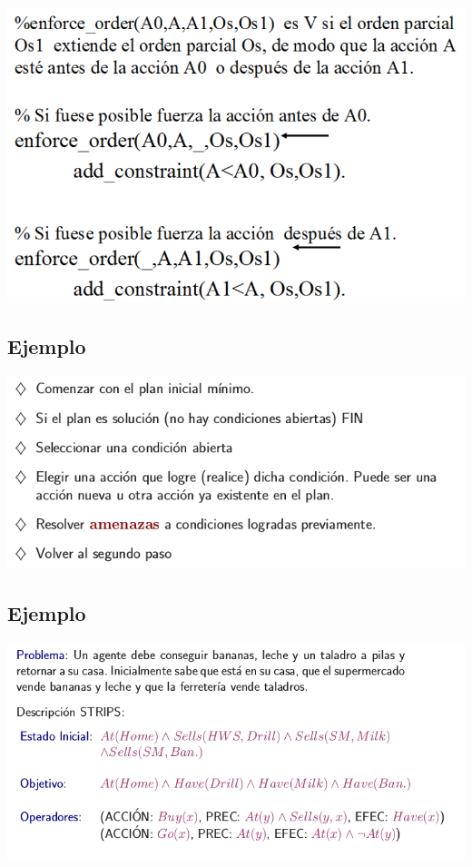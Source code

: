 \documentclass[11pt]{article}
\begin{document}
\begin{center}
\includegraphics[width=.9\linewidth]{imagenes/Pop8.png}
\end{center}

\subsection*{Ejemplo}
\label{sec:org7c417ec}

\begin{center}
\includegraphics[width=.9\linewidth]{imagenes/poppseudo.png}
\end{center}

\subsection*{Ejemplo}
\label{sec:org7e6879e}

\begin{center}
\includegraphics[width=.9\linewidth]{imagenes/pop0.png}
\end{center}
\end{document}
